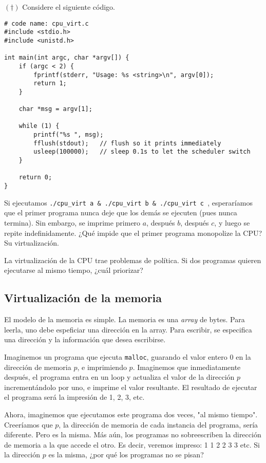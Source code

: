 \documentclass[12pt]{article}
\theoremstyle{definition}
\begin{document}
\begin{shaded}

    $(\dagger)$ Considere el siguiente código.
    
\begin{verbatim}
# code name: cpu_virt.c
#include <stdio.h>
#include <unistd.h>

int main(int argc, char *argv[]) {
    if (argc < 2) {
        fprintf(stderr, "Usage: %s <string>\n", argv[0]);
        return 1;
    }

    char *msg = argv[1];

    while (1) {
        printf("%s ", msg);
        fflush(stdout);   // flush so it prints immediately
        usleep(100000);   // sleep 0.1s to let the scheduler switch
    }

    return 0;
}
\end{verbatim}

Si ejecutamos \texttt{./cpu\_virt a & ./cpu\_virt b & ./cpu\_virt c  },
esperaríamos que el primer programa nunca deje que los demás se ejecuten (pues
nunca termina). Sin embargo, se imprime primero $a$, después $b$, después $c$, y
luego se repite indefinidamente. ¿Qué impide que el primer programa monopolize
la CPU? Su virtualización.
\end{shaded}

La virtualización de la CPU trae problemas de política. Si dos programas quieren
ejecutarse al mismo tiempo, ¿cuál priorizar?  

\subsection{Virtualización de la memoria}

El modelo de la memoria es simple. La memoria es una \textit{array} de bytes.
Para leerla, uno debe espeficiar una dirección en la array. Para escribir, 
se especifica una dirección y la información que desea escribirse. 

Imaginemos un programa que ejecuta \texttt{malloc}, guarando el valor entero $0$
en la dirección de memoria $p$, e imprimiendo $p$. Imaginemos que inmediatamente
después, el programa entra en un loop y actualiza el valor de la dirección $p$
incrementándolo por uno, e imprime el valor resultante. El resultado de ejecutar
el programa será la impresión de 1, 2, 3, etc.

Ahora, imaginemos que ejecutamos este programa dos veces, "al mismo tiempo". 
Creeríamos que $p$, la dirección de memoria de cada instancia del programa,
sería diferente. Pero es la misma. Más aún, los programas no sobreescriben la
dirección de memoria a la que accede el otro. Es decir, veremos impreso: 1 1 2 2
3 3 etc. Si la dirección $p$ es la misma, ¿por qué los programas no se pisan? 
\end{document}
